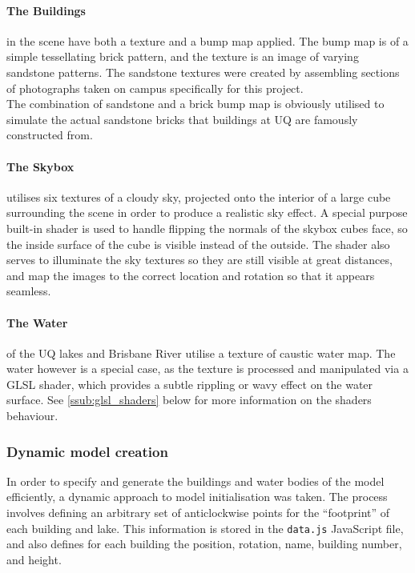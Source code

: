             \paragraph{The Buildings} %
            \label{par:the_buildings}
                in the scene have both a texture and a bump map applied.
                The bump map is of a simple tessellating brick pattern, and the texture is an image of varying sandstone patterns.
                The sandstone textures were created by assembling sections of photographs taken on campus specifically for this project.\\

                The combination of sandstone and a brick bump map is obviously utilised to simulate the actual sandstone bricks that buildings at UQ are famously constructed from.

            \paragraph{The Skybox} %
            \label{par:the_skybox}
                utilises six textures of a cloudy sky, projected onto the interior of a large cube surrounding the scene in order to produce a realistic sky effect.
                A special purpose built-in shader is used to handle flipping the normals of the skybox cubes face, so the inside surface of the cube is visible instead of the outside.
                The shader also serves to illuminate the sky textures so they are still visible at great distances, and map the images to the correct location and rotation so that it appears seamless.
            
            \paragraph{The Water} %
            \label{par:the_water}
                of the UQ lakes and Brisbane River utilise a texture of caustic water map.
                The water however is a special case, as the texture is processed and manipulated via a GLSL shader, which provides a subtle rippling or wavy effect on the water surface.
                See \ref{ssub:glsl_shaders} below for more information on the shaders behaviour.

        \subsubsection{Dynamic model creation} %
        \label{ssub:dynamic_model_creation}
            In order to specify and generate the buildings and water bodies of the model efficiently, a dynamic approach to model initialisation was taken.
            The process involves defining an arbitrary set of anticlockwise points for the ``footprint'' of each building and lake.
            This information is stored in the \texttt{data.js} JavaScript file, and also defines for each building the position, rotation, name, building number, and height.\\

